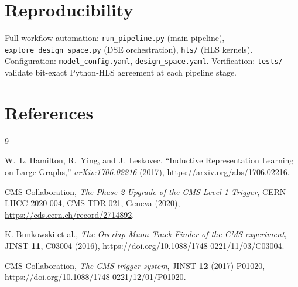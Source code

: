 \documentclass[10pt]{article}
\begin{document}
\vspace{-0.2em}
\section*{Reproducibility}
Full workflow automation: \texttt{run\_pipeline.py} (main pipeline), \texttt{explore\_design\_space.py} (DSE orchestration), \texttt{hls/} (HLS kernels). Configuration: \texttt{model\_config.yaml}, \texttt{design\_space.yaml}. Verification: \texttt{tests/} validate bit-exact Python-HLS agreement at each pipeline stage.

\vspace{-0.2em}
\section*{References}

\begin{thebibliography}{9}

W.~L. Hamilton, R.~Ying, and J.~Leskovec,
``Inductive Representation Learning on Large Graphs,''
\emph{arXiv:1706.02216} (2017), \url{https://arxiv.org/abs/1706.02216}.

CMS Collaboration, \textit{The Phase-2 Upgrade of the CMS Level-1 Trigger}, CERN-LHCC-2020-004, CMS-TDR-021, Geneva (2020), \url{https://cds.cern.ch/record/2714892}.

K. Bunkowski et al., \textit{The Overlap Muon Track Finder of the CMS experiment}, JINST \textbf{11}, C03004 (2016), \url{https://doi.org/10.1088/1748-0221/11/03/C03004}.

CMS Collaboration, \textit{The CMS trigger system}, JINST \textbf{12} (2017) P01020, \url{https://doi.org/10.1088/1748-0221/12/01/P01020}.

\end{thebibliography}
\end{document}
